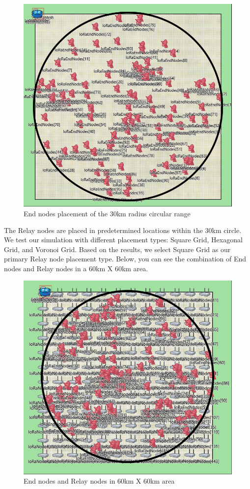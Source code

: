 \begin{figure}[ht!]
    \centering
    \includegraphics[scale=0.3]{images/End nodes.png}
    \caption{End nodes placement of the 30km radius circular range}
\end{figure}

The Relay nodes are placed in predetermined locations within the 30km circle. We test our simulation with different placement types: Square Grid, Hexagonal Grid, and Voronoi Grid. Based on the results, we select Square Grid as our primary Relay node placement type. Below, you can see the combination of End nodes and Relay nodes in a 60km X 60km area.



\begin{figure}
    \centering
    \includegraphics[width=0.6\linewidth]{images/Relays.png}
    \caption{End nodes and Relay nodes in 60km X 60km area}
    \label{fig:enter-label}
\end{figure}

